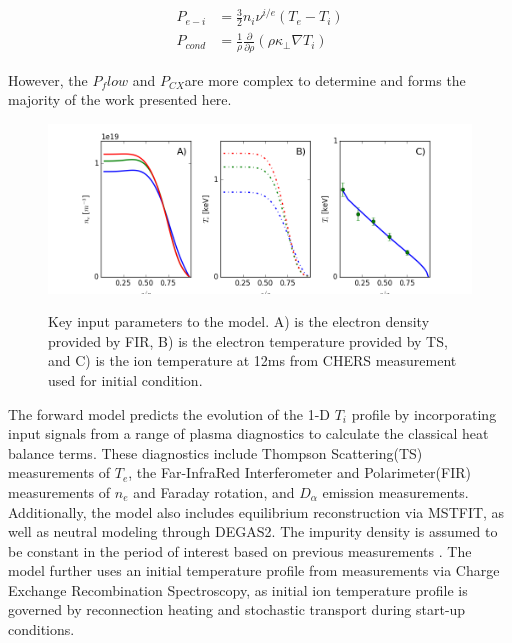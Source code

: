 \documentclass[aip, pop, preprint]{revtex4-1}
\begin{document}
\begin{align}\label{eqn:p_ei}
    P_{e-i} &= \frac{3}{2}n_i\nu^{i/e}(T_e - T_i)\\
    P_{cond} &= \frac{1}{\rho}\frac{\partial}{\partial\rho}(\rho\kappa_{\perp}\nabla T_{i})
\end{align}

However, the $P_flow$ and $P_{CX}$are more complex to determine and forms the majority of the work presented here. 

\begin{figure}
	\centering
	\includegraphics[width = 1.\linewidth]{./plots/model_inputs}
	\label{fig:model_inputs}
	\caption{Key input parameters to the model. A) is the electron density provided by FIR, B) is the electron temperature provided by TS, and C) is the ion temperature at 12ms from CHERS measurement used for initial condition.}
\end{figure}%

The forward model predicts the evolution of the
1-D $T_i$ profile by incorporating input signals from a range of plasma
diagnostics to calculate the classical heat balance terms. These diagnostics include Thompson Scattering(TS) measurements of $T_e$\cite{Kubala2016UpgradesDiagnostic, DenHartog2010Pulse-burstScattering}, the Far-InfraRed Interferometer and Polarimeter(FIR) measurements of $n_e$ and
Faraday rotation\cite{Yates2008SimultaneousMST, Brower2001MultichannelPinch}, and $D_{\alpha}$ emission measurements. Additionally, the model also includes equilibrium reconstruction via MSTFIT\cite{Anderson2004EquilibriumPinch}, as well as neutral modeling through
DEGAS2\cite{Stotler1994Neutral2,Stotler1994Neutral2}. The impurity density is assumed to be constant in the period of
interest based on previous measurements \cite{Kumar2012a,Nornberg2018IncorporatingCharge}. The
model further uses an initial temperature profile from measurements via Charge Exchange Recombination Spectroscopy\cite{DenHartog2006Advancesinvited}, as initial ion temperature profile is governed by reconnection heating and stochastic transport during start-up conditions. 
\end{document}
